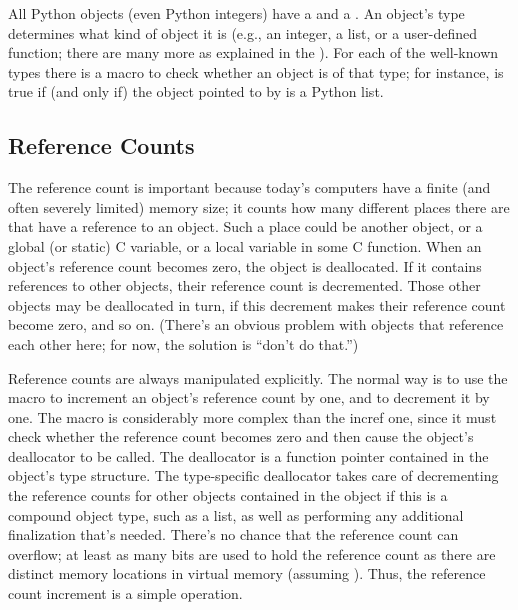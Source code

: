 All Python objects (even Python integers) have a  and a
.  An object's type determines what kind of object 
it is (e.g., an integer, a list, or a user-defined function; there are 
many more as explained in the ).  For each of the well-known types there is a macro
to check whether an object is of that type; for instance,
 is true if (and only if) the object
pointed to by  is a Python list.


\subsection{Reference Counts \label{refcounts}}

The reference count is important because today's computers have a 
finite (and often severely limited) memory size; it counts how many 
different places there are that have a reference to an object.  Such a 
place could be another object, or a global (or static) C variable, or 
a local variable in some C function.  When an object's reference count 
becomes zero, the object is deallocated.  If it contains references to 
other objects, their reference count is decremented.  Those other 
objects may be deallocated in turn, if this decrement makes their 
reference count become zero, and so on.  (There's an obvious problem 
with objects that reference each other here; for now, the solution is 
``don't do that.'')

Reference counts are always manipulated explicitly.  The normal way is 
to use the macro  to
increment an object's reference count by one, and
 to decrement it by  
one.  The  macro is considerably more complex
than the incref one, since it must check whether the reference count
becomes zero and then cause the object's deallocator to be called.
The deallocator is a function pointer contained in the object's type
structure.  The type-specific deallocator takes care of decrementing
the reference counts for other objects contained in the object if this
is a compound object type, such as a list, as well as performing any
additional finalization that's needed.  There's no chance that the
reference count can overflow; at least as many bits are used to hold
the reference count as there are distinct memory locations in virtual
memory (assuming ).  Thus, the
reference count increment is a simple operation.

